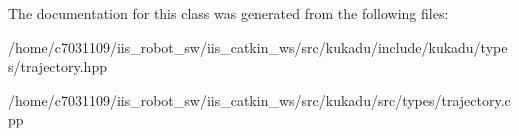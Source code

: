 The documentation for this class was generated from the following files\-:\begin{DoxyCompactItemize}
\item 
/home/c7031109/iis\-\_\-robot\-\_\-sw/iis\-\_\-catkin\-\_\-ws/src/kukadu/include/kukadu/types/trajectory.\-hpp\item 
/home/c7031109/iis\-\_\-robot\-\_\-sw/iis\-\_\-catkin\-\_\-ws/src/kukadu/src/types/trajectory.\-cpp\end{DoxyCompactItemize}

